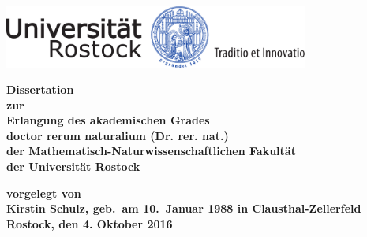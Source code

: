 
\thispagestyle{empty}
\begin{center}
\vspace*{-2cm}
\includegraphics[width=0.75\textwidth]{unilogo-siegel-farbe}\\
\vspace*{3cm}
    {\titlefont \huge \onehalfspacing
	\thetitle 
    \par}%
   \vfill
    {\normalfont\normalcolor\bfseries
	\large
	Dissertation \\
	\large
	zur\\
	Erlangung des akademischen Grades\\
	doctor rerum naturalium (Dr. rer. nat.)\\ 
	der Mathematisch-Naturwissenschaftlichen Fakultät\\
	der Universität Rostock
    \par}%
\end{center}\par
\vspace*{2.5cm}
\noindent\begin{minipage}[b]{\textwidth}
{\bf
  \noindent vorgelegt von\\
  Kirstin Schulz, geb.~am 10.~Januar 1988 in 
Clausthal-Zellerfeld\\



  \noindent Rostock, den 4. Oktober 2016
  }
\end{minipage}


